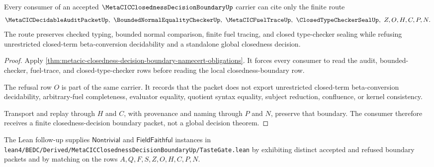 \begin{theorem}
\label{thm:metacic-closedness-decision-boundary-nonescape}
Every consumer of an accepted $\MetaCICClosednessDecisionBoundaryUp$ carrier can cite only the finite route
$$
\MetaCICDecidableAuditPacketUp,\ \BoundedNormalEqualityCheckerUp,\ \MetaCICFuelTraceUp,\ \ClosedTypeCheckerSealUp,\ Z,O,H,C,P,N.
$$
The route preserves checked typing, bounded normal comparison, finite fuel tracing, and closed type-checker sealing while refusing unrestricted closed-term beta-conversion decidability and a standalone global closedness decision.
\end{theorem}
\begin{proof}
Apply \autoref{thm:metacic-closedness-decision-boundary-namecert-obligations}. It forces every consumer to read the audit, bounded-checker, fuel-trace, and closed-type-checker rows before reading the local closedness-boundary row.

The refusal row $O$ is part of the same carrier. It records that the packet does not export unrestricted closed-term beta-conversion decidability, arbitrary-fuel completeness, evaluator equality, quotient syntax equality, subject reduction, confluence, or kernel consistency.

Transport and replay through $H$ and $C$, with provenance and naming through $P$ and $N$, preserve that boundary. The consumer therefore receives a finite closedness-decision boundary packet, not a global decision theorem.
\end{proof}

The Lean follow-up supplies $\mathsf{Nontrivial}$ and $\mathsf{FieldFaithful}$ instances in \texttt{lean4/BEDC/Derived/MetaCICClosednessDecisionBoundaryUp/TasteGate.lean} by exhibiting distinct accepted and refused boundary packets and by matching on the rows $A,Q,F,S,Z,O,H,C,P,N$.


